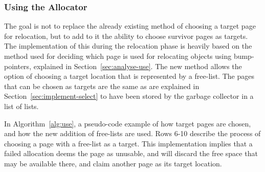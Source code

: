 \subsubsection{Using the Allocator}
\label{sec:implement-use}
The goal is not to replace the already existing method of choosing a target page for relocation, but to add to it the ability to choose survivor pages as targets. The implementation of this during the relocation phase is heavily based on the method used for deciding which page is used for relocating objects using bump-pointers, explained in Section~\ref{sec:analyse-use}. The new method allows the option of choosing a target location that is represented by a free-list. The pages that can be chosen as targets are the same as are explained in Section~\ref{sec:implement-select} to have been stored by the garbage collector in a list of lists. 

In Algorithm~\ref{alg:use}, a pseudo-code example of how target pages are chosen, and how the new addition of free-lists are used. Rows 6-10 describe the process of choosing a page with a free-list as a target. This implementation implies that a failed allocation deems the page as unusable, and will discard the free space that may be available there, and claim another page as its target location.

